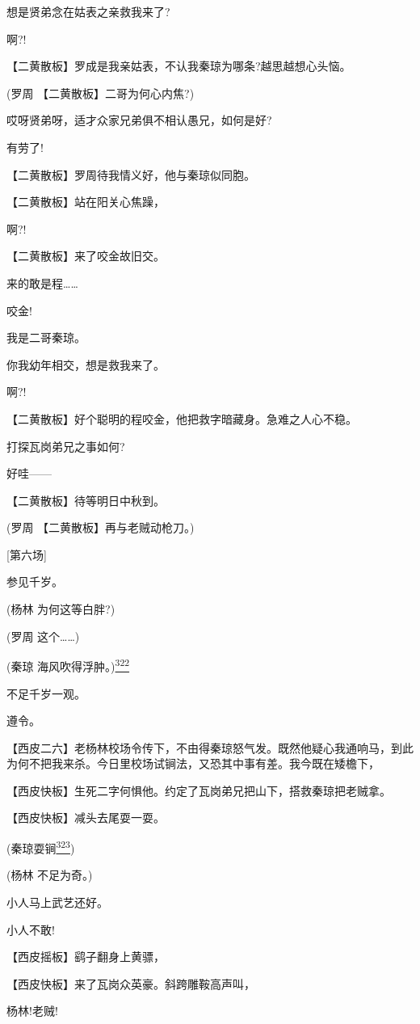 想是贤弟念在姑表之亲救我来了?

啊?!

【二黄散板】罗成是我亲姑表，不认我秦琼为哪条?越思越想心头恼。

(罗周 【二黄散板】二哥为何心内焦?)

哎呀贤弟呀，适才众家兄弟俱不相认愚兄，如何是好?

有劳了!

【二黄散板】罗周待我情义好，他与秦琼似同胞。

【二黄散板】站在阳关心焦躁，

啊?!

【二黄散板】来了咬金故旧交。

来的敢是程\ldots{}\ldots{}

咬金!

我是二哥秦琼。

你我幼年相交，想是救我来了。

啊?!

【二黄散板】好个聪明的程咬金，他把救字暗藏身。急难之人心不稳。

打探瓦岗弟兄之事如何?

好哇------

【二黄散板】待等明日中秋到。

(罗周 【二黄散板】再与老贼动枪刀。)

{[}第六场{]}

参见千岁。

(杨林 为何这等白胖?)

(罗周 这个\ldots{}\ldots{})

(秦琼 海风吹得浮肿。)\protect\hyperlink{fn322}{\textsuperscript{322}}

不足千岁一观。

遵令。

【西皮二六】老杨林校场令传下，不由得秦琼怒气发。既然他疑心我通响马，到此为何不把我来杀。今日里校场试锏法，又恐其中事有差。我今既在矮檐下，

【西皮快板】生死二字何惧他。约定了瓦岗弟兄把山下，搭救秦琼把老贼拿。

【西皮快板】减头去尾耍一耍。

(秦琼耍锏\protect\hyperlink{fn323}{\textsuperscript{323}})

(杨林 不足为奇。)

小人马上武艺还好。

小人不敢!

【西皮摇板】鹞子翻身上黄骠，

【西皮快板】来了瓦岗众英豪。斜跨雕鞍高声叫，

杨林!老贼!

